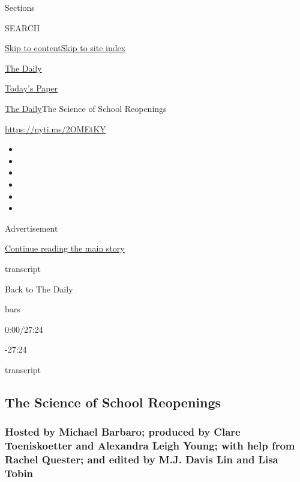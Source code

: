 Sections

SEARCH

\protect\hyperlink{site-content}{Skip to
content}\protect\hyperlink{site-index}{Skip to site index}

\href{https://www.nytimes3xbfgragh.onion/podcasts/the-daily}{The Daily}

\href{https://myaccount.nytimes3xbfgragh.onion/auth/login?response_type=cookie\&client_id=vi}{}

\href{https://www.nytimes3xbfgragh.onion/section/todayspaper}{Today's
Paper}

\href{/podcasts/the-daily}{The Daily}\textbar{}The Science of School
Reopenings

\url{https://nyti.ms/2OMEtKY}

\begin{itemize}
\item
\item
\item
\item
\item
\item
\end{itemize}

Advertisement

\protect\hyperlink{after-top}{Continue reading the main story}

transcript

Back to The Daily

bars

0:00/27:24

-27:24

transcript

\hypertarget{the-science-of-school-reopenings}{%
\subsection{The Science of School
Reopenings}\label{the-science-of-school-reopenings}}

\hypertarget{hosted-by-michael-barbaro-produced-by-clare-toeniskoetter-and-alexandra-leigh-young-with-help-from-rachel-quester-and-edited-by-mj-davis-lin-and-lisa-tobin}{%
\subsubsection{Hosted by Michael Barbaro; produced by Clare
Toeniskoetter and Alexandra Leigh Young; with help from Rachel Quester;
and edited by M.J. Davis Lin and Lisa
Tobin}\label{hosted-by-michael-barbaro-produced-by-clare-toeniskoetter-and-alexandra-leigh-young-with-help-from-rachel-quester-and-edited-by-mj-davis-lin-and-lisa-tobin}}

